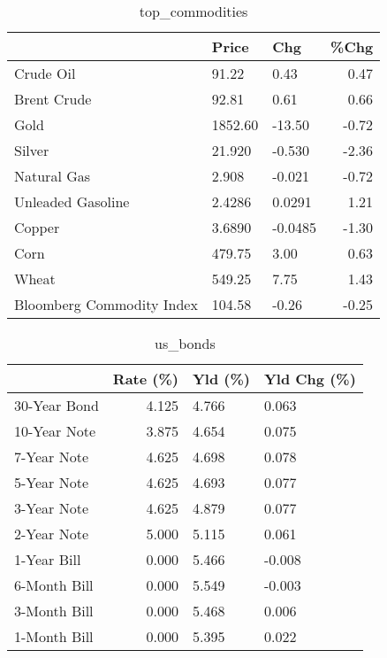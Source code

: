 \documentclass{article}%
\begin{document}
\begin{table}[htbp]%
\caption{top\_commodities}%
\centering%
\begin{adjustbox}{width=1\textwidth}%
\begin{tabular}{lllr}
\toprule
                          &   Price &     Chg &  \%Chg \\
\midrule
               Crude Oil  &   91.22 &    0.43 &  0.47 \\
             Brent Crude  &   92.81 &    0.61 &  0.66 \\
                    Gold  & 1852.60 &  -13.50 & -0.72 \\
                  Silver  &  21.920 &  -0.530 & -2.36 \\
             Natural Gas  &   2.908 &  -0.021 & -0.72 \\
       Unleaded Gasoline  &  2.4286 &  0.0291 &  1.21 \\
                  Copper  &  3.6890 & -0.0485 & -1.30 \\
                    Corn  &  479.75 &    3.00 &  0.63 \\
                   Wheat  &  549.25 &    7.75 &  1.43 \\
Bloomberg Commodity Index &  104.58 &   -0.26 & -0.25 \\
\bottomrule
\end{tabular}
%
\end{adjustbox}%
\end{table}

%


\begin{table}[htbp]%
\caption{us\_bonds}%
\centering%
\begin{adjustbox}{width=1\textwidth}%
\begin{tabular}{lrll}
\toprule
             &  Rate (\%) & Yld (\%) & Yld Chg (\%) \\
\midrule
30-Year Bond &     4.125 &   4.766 &       0.063 \\
10-Year Note &     3.875 &   4.654 &       0.075 \\
 7-Year Note &     4.625 &   4.698 &       0.078 \\
 5-Year Note &     4.625 &   4.693 &       0.077 \\
 3-Year Note &     4.625 &   4.879 &       0.077 \\
 2-Year Note &     5.000 &   5.115 &       0.061 \\
 1-Year Bill &     0.000 &   5.466 &      -0.008 \\
6-Month Bill &     0.000 &   5.549 &      -0.003 \\
3-Month Bill &     0.000 &   5.468 &       0.006 \\
1-Month Bill &     0.000 &   5.395 &       0.022 \\
\bottomrule
\end{tabular}
%
\end{adjustbox}%
\end{table}
\end{document}
